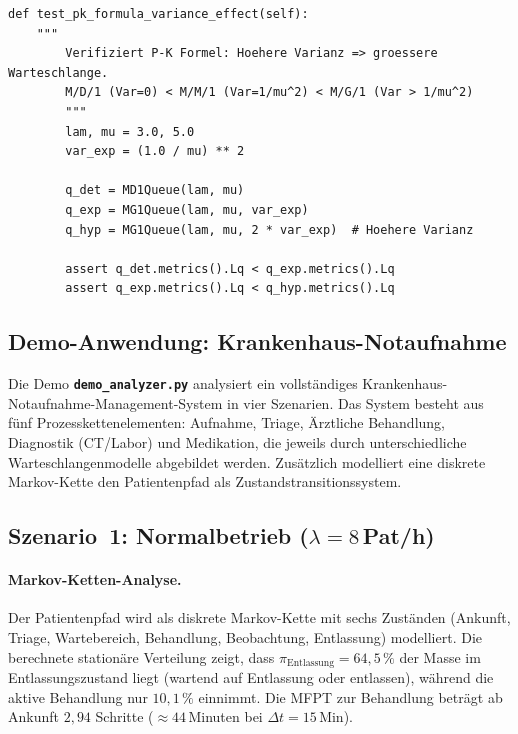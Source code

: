 ﻿\documentclass[a4paper,12pt]{report}
\theoremstyle{definition}
\begin{document}
\begin{lstlisting}[style=python, caption={Test: P-K-Formel -- höhere Varianz ergibt längere Warteschlange}, label=lst:test-pk]
def test_pk_formula_variance_effect(self):
	"""
        Verifiziert P-K Formel: Hoehere Varianz => groessere Warteschlange.
        M/D/1 (Var=0) < M/M/1 (Var=1/mu^2) < M/G/1 (Var > 1/mu^2)
        """
        lam, mu = 3.0, 5.0
        var_exp = (1.0 / mu) ** 2

        q_det = MD1Queue(lam, mu)
        q_exp = MG1Queue(lam, mu, var_exp)
        q_hyp = MG1Queue(lam, mu, 2 * var_exp)  # Hoehere Varianz

        assert q_det.metrics().Lq < q_exp.metrics().Lq
        assert q_exp.metrics().Lq < q_hyp.metrics().Lq
\end{lstlisting}

\subsection{Demo-Anwendung: Krankenhaus-Notaufnahme}
\label{sec:demo-krankenhaus-system}

Die Demo \texttt{\textbf{demo\_analyzer.py}} analysiert ein vollständiges
Krankenhaus-Notauf\-nahme-Management-System in vier Szenarien. Das System
besteht aus fünf Prozesskettenelementen: Aufnahme, Triage, Ärztliche
Behandlung, Diagnostik (CT/Labor) und Medikation, die jeweils durch
unterschiedliche Warteschlangenmodelle abgebildet werden. Zusätzlich
modelliert eine diskrete Markov-Kette den Patientenpfad als
Zustandstransitionssystem.

\subsection{Szenario~1: Normalbetrieb ($\lambda = 8$\,Pat/h)}

\paragraph{Markov-Ketten-Analyse.}
Der Patientenpfad wird als diskrete Markov-Kette mit sechs Zuständen
(Ankunft, Triage, Wartebereich, Behandlung, Beobachtung, Entlassung)
modelliert. Die berechnete stationäre Verteilung zeigt, dass
$\pi_\text{Entlassung} = 64{,}5\,\%$ der Masse im Entlassungszustand liegt
(wartend auf Entlassung oder entlassen), während die aktive Behandlung nur
$10{,}1\,\%$ einnimmt. Die MFPT zur Behandlung beträgt ab Ankunft
$2{,}94$ Schritte ($\approx 44$\,Minuten bei $\Delta t = 15$\,Min).
\end{document}
